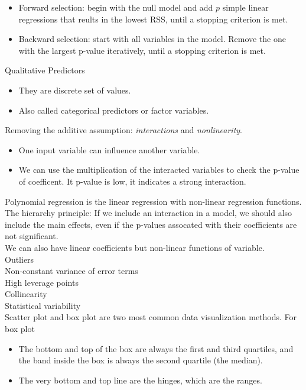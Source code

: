 \documentclass[11pt, a4paper]{article}
\begin{document}
\begin{itemize}
  \item Forward selection: begin with the null model and add $p$ simple linear regressions that reults in the lowest RSS, until a stopping criterion is met.
  \item Backward selection: start with all variables in the model. Remove the one with the largest p-value iteratively, until a stopping criterion is met.
\end{itemize}
Qualitative Predictors
\begin{itemize}
\item They are discrete set of values.
\item Also called categorical predictors or factor variables.
\end{itemize}
Removing the additive assumption: \emph{interactions} and \emph{nonlinearity}.
\begin{itemize}
\item One input variable can influence another variable.
\item We can use the multiplication of the interacted variables to check the p-value of coefficent. It p-value is low, it indicates a strong interaction. 
\end{itemize}
Polynomial regression is the linear regression with non-linear regression functions.\\[1mm]
The hierarchy principle: If we include an interaction in a model, we should also include the main effects, even if the p-values assocated with their coefficients are not significant.\\
We can also have linear coefficients but non-linear functions of variable.\\[1mm]
Outliers\\[1mm]
Non-constant variance of error terms\\[1mm]
High leverage points\\[1mm]
Collinearity\\[1mm]
Statistical variability\\[1mm]
Scatter plot and box plot are two most common data visualization methods. For box plot
\begin{itemize}
\item The bottom and top of the box are always the first and third quartiles, and the band inside the box is always the second quartile (the median). 
\item The very bottom and top line are the hinges, which are the ranges.
\end{itemize}
\end{document}
